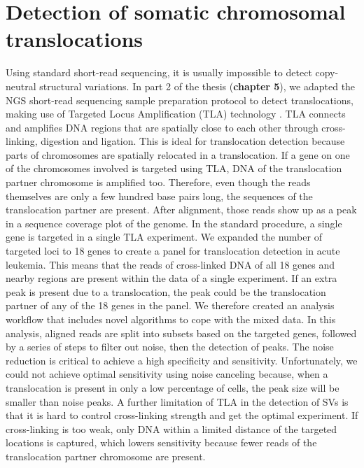 \section{Detection of somatic chromosomal \newline translocations} \label{Somatic}
Using standard short-read sequencing, it is usually impossible to detect copy-neutral structural variations. 
In part 2 of the thesis (\textbf{chapter 5}), we adapted the NGS short-read sequencing sample preparation protocol to detect translocations, making use of Targeted Locus Amplification (TLA) technology \cite{de_Vree_2014}. 
TLA connects and amplifies DNA regions that are spatially close to each other through cross-linking, digestion and ligation. 
This is ideal for translocation detection because parts of chromosomes are spatially relocated in a translocation. 
If a gene on one of the chromosomes involved is targeted using TLA, DNA of the translocation partner chromosome is amplified too. 
Therefore, even though the reads themselves are only a few hundred base pairs long, the sequences of the translocation partner are present. 
After alignment, those reads show up as a peak in a sequence coverage plot of the genome. 
In the standard procedure, a single gene is targeted in a single TLA experiment. 
We expanded the number of targeted loci to 18 genes to create a panel for translocation detection in acute leukemia. 
This means that the reads of cross-linked DNA of all 18 genes and nearby regions are present within the data of a single experiment. 
If an extra peak is present due to a translocation, the peak could be the translocation partner of any of the 18 genes in the panel. 
We therefore created an analysis workflow that includes novel algorithms to cope with the mixed data. In this analysis, aligned reads are split into subsets based on the targeted genes, followed by a series of steps to filter out noise, then the detection of peaks. 
The noise reduction is critical to achieve a high specificity and sensitivity. Unfortunately, we could not achieve optimal sensitivity using noise canceling because, when a translocation is present in only a low percentage of cells, the peak size will be smaller than noise peaks. 
A further limitation of TLA in the detection of SVs is that it is hard to control cross-linking strength and get the optimal experiment. 
If cross-linking is too weak, only DNA within a limited distance of the targeted locations is captured, which lowers sensitivity because fewer reads of the translocation partner chromosome are present. 
